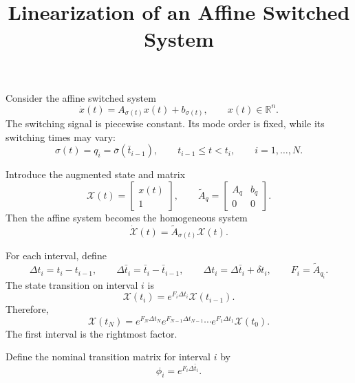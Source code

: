 \documentclass[12pt]{article}
\title{Linearization of an Affine Switched System}
\author{}
\date{}
\newcommand{\R}{\mathbb{R}}
\newcommand{\X}{\mathcal{X}}
\begin{document}
\maketitle



Consider the affine switched system
\begin{equation}
    \dot{x}(t)=A_{\sigma(t)}x(t)+b_{\sigma(t)},
    \qquad x(t)\in\R^n.
    \tag{1}
\end{equation}
The switching signal is piecewise constant.  Its mode order is fixed,
while its switching times may vary:
\begin{equation}
    \sigma(t)=q_i=\bar\sigma(\bar t_{i-1}),
    \qquad t_{i-1}\leq t<t_i,
    \qquad i=1,\ldots,N.
    \tag{2}
\end{equation}

Introduce the augmented state and matrix
\begin{equation}
    \X(t)=\begin{bmatrix}x(t)\\1\end{bmatrix},
    \qquad
    \widetilde A_q=
    \begin{bmatrix}A_q&b_q\\0&0\end{bmatrix}.
\end{equation}
Then the affine system becomes the homogeneous system
\begin{equation}
    \boxed{\dot{\X}(t)=\widetilde A_{\sigma(t)}\X(t)}.
\end{equation}



For each interval, define
\begin{equation}
    \Delta t_i=t_i-t_{i-1},
    \qquad
    \Delta\bar t_i=\bar t_i-\bar t_{i-1},
    \qquad
    \Delta t_i=\Delta\bar t_i+\delta t_i,
    \qquad
    F_i=\widetilde A_{q_i}.
\end{equation}
The state transition on interval $i$ is
\begin{equation}
    \X(t_i)=e^{F_i\Delta t_i}\X(t_{i-1}).
\end{equation}
Therefore,
\begin{equation}
    \X(t_N)=
    e^{F_N\Delta t_N} e^{F_{N-1}\Delta t_{N-1}}\cdots e^{F_1\Delta t_1}\X(t_0).
    \label{eq:actual}
\end{equation}
The first interval is the rightmost factor.

Define the nominal transition matrix for interval $i$ by
\begin{equation}
    \phi_i=e^{F_i\Delta\bar t_i}.
    \label{eq:transition-definitions}
\end{equation}
\end{document}
